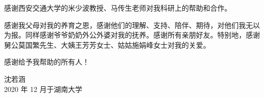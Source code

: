 感谢西安交通大学的米少波教授、马传生老师对我科研上的帮助和合作。

感谢我父母对我的养育之恩，感谢他们的理解、支持、陪伴、期待，对他们我无以为报。同样感谢爷爷奶奶外公外婆对我的抚养。感谢所有亲朋好友。特别地，感谢舅公莫国繁先生、大姨王芳芳女士、姑姑施娟峰女士对我的关爱。

感谢给予我帮助的所有人！

\begin{flushright}沈若涵\\2020 年 12 月于湖南大学\end{flushright}




